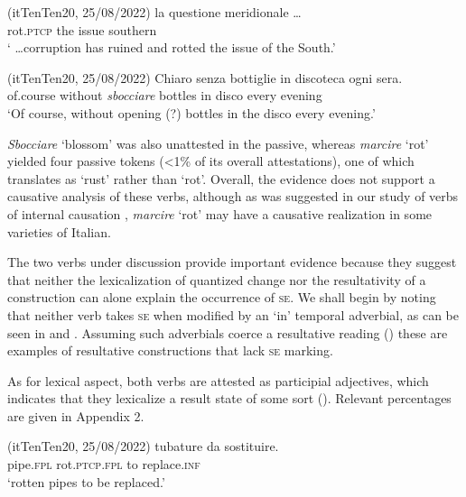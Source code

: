 \documentclass[output=paper,colorlinks,citecolor=brown
]{langscibook}
\begin{document}
\hspace*{\fill}(itTenTen20, 25/08/2022)\quad
\ea \label{bentley_example_16}
     	la			questione	meridionale \ldots   \\
    {} rot.\textsc{ptcp}		the		issue					southern \\
    \glt ‘ \ldots  corruption has ruined and rotted the issue of the South.’
\z


\hspace*{\fill}(itTenTen20, 25/08/2022)\quad
\ea \label{bentley_example_17}
    \gll Chiaro 			senza			 bottiglie	in	discoteca		ogni		sera.  \\
 of.course		without	\textit{sbocciare}	bottles			in disco					every evening \\
    \glt ‘Of course, without opening (?) bottles in the disco every evening.’
\z

\textit{Sbocciare} ‘blossom’ was also unattested in the passive, whereas \textit{marcire} ‘rot’ yielded four passive tokens (<1\% of its overall attestations), one of which translates as ‘rust’ rather than ‘rot’. Overall, the evidence does not support a causative analysis of these verbs, although as was suggested in our study of verbs of internal causation \citep{bentley2023internally}, \textit{marcire} ‘rot’ may have a causative realization in some varieties of Italian.

The two verbs under discussion provide important evidence because they suggest that neither the lexicalization of quantized change nor the resultativity of a construction can alone explain the occurrence of \textsc{se}. We shall begin by noting that neither verb takes \textsc{se} when modified by an ‘in’ temporal adverbial, as can be seen in  and . Assuming such adverbials coerce a resultative reading (\cites[332—336]{dowty1979word}{hay1999scalar}) these are examples of resultative constructions that lack \textsc{se} marking.

As for lexical aspect, both verbs are attested as participial adjectives, which indicates that they lexicalize a result state of some sort (\cites[]{hout2004unaccusativity}[355]{bentley2006split}[283—284]{legendre2017auxiliaries}). Relevant percentages are given in Appendix 2.

\hspace*{\fill}(itTenTen20, 25/08/2022)\quad
\ea \label{bentley_example_18}
    \gll tubature							da 	sostituire.   \\
    pipe.\textsc{fpl}	rot.\textsc{ptcp}.\textsc{fpl}	to		replace.\textsc{inf}		 \\
    \glt ‘rotten pipes to be replaced.’
\z
\end{document}
